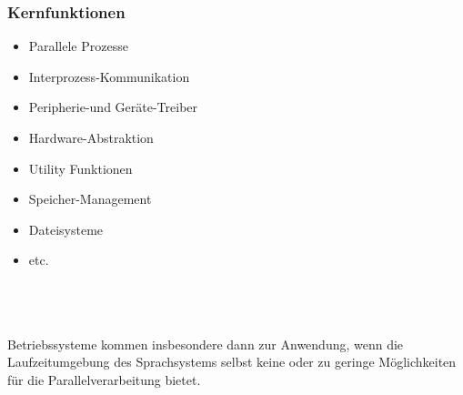 \subsubsection{Kernfunktionen}
\begin{minipage}{0.5\textwidth}
    \begin{itemize}
        \item Parallele Prozesse
        \item Interprozess-Kommunikation
        \item Peripherie-und Geräte-Treiber
        \item Hardware-Abstraktion
    \end{itemize}
\end{minipage}
\hfill
\begin{minipage}{0.45\textwidth}
    \begin{itemize}
        \item Utility Funktionen
        \item Speicher-Management
        \item Dateisysteme
        \item etc.
    \end{itemize}
\end{minipage} \\ \\ \\
Betriebssysteme kommen insbesondere dann zur Anwendung, wenn die Laufzeitumgebung des Sprachsystems selbst keine oder zu geringe Möglichkeiten für die Parallelverarbeitung bietet.

